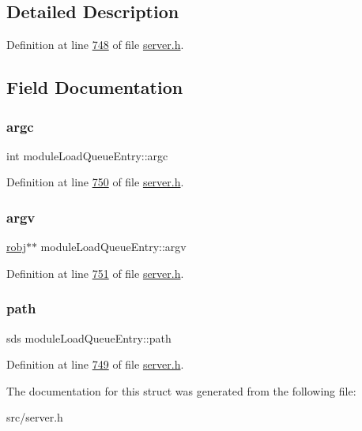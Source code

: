 \subsection{Detailed Description}


Definition at line \hyperlink{server_8h_source_l00748}{748} of file \hyperlink{server_8h_source}{server.\+h}.



\subsection{Field Documentation}
\mbox{\label{structmoduleLoadQueueEntry_a2dc0861954e6b66f6686ec821ffdd9e0}} 
\subsubsection{\texorpdfstring{argc}{argc}}
{\footnotesize\ttfamily int module\+Load\+Queue\+Entry\+::argc}



Definition at line \hyperlink{server_8h_source_l00750}{750} of file \hyperlink{server_8h_source}{server.\+h}.

\mbox{\label{structmoduleLoadQueueEntry_a5aa2d49960e9d8e8836f6290f2070290}} 
\subsubsection{\texorpdfstring{argv}{argv}}
{\footnotesize\ttfamily \hyperlink{structredisObject}{robj}$\ast$$\ast$ module\+Load\+Queue\+Entry\+::argv}



Definition at line \hyperlink{server_8h_source_l00751}{751} of file \hyperlink{server_8h_source}{server.\+h}.

\mbox{\label{structmoduleLoadQueueEntry_a066b343dd79be3ae82b3c47d8a634ec8}} 
\subsubsection{\texorpdfstring{path}{path}}
{\footnotesize\ttfamily sds module\+Load\+Queue\+Entry\+::path}



Definition at line \hyperlink{server_8h_source_l00749}{749} of file \hyperlink{server_8h_source}{server.\+h}.



The documentation for this struct was generated from the following file\+:\begin{DoxyCompactItemize}
\item 
src/server.\+h\end{DoxyCompactItemize}
